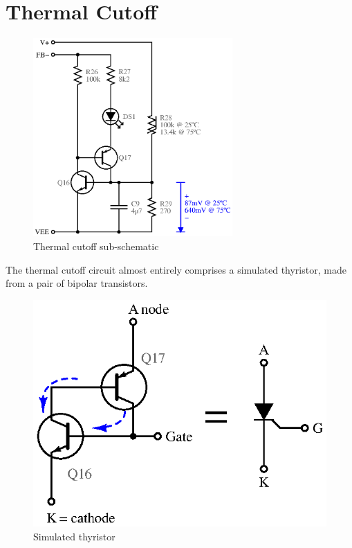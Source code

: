 \section{Thermal Cutoff}

\begin{multicols}{2}

\begin{figure}[H]
\centering
\includegraphics[width=3in]{sch/thermal}
\caption{Thermal cutoff sub-schematic}
\label{fig:thermal}
\end{figure}

The thermal cutoff circuit almost entirely comprises a simulated thyristor,
made from a pair of bipolar transistors.

\begin{figure}[H]
\centering
\includegraphics[width=\columnwidth]{sch/thy}
\caption{Simulated thyristor}
\label{fig:thy}
\end{figure}


\end{multicols}
